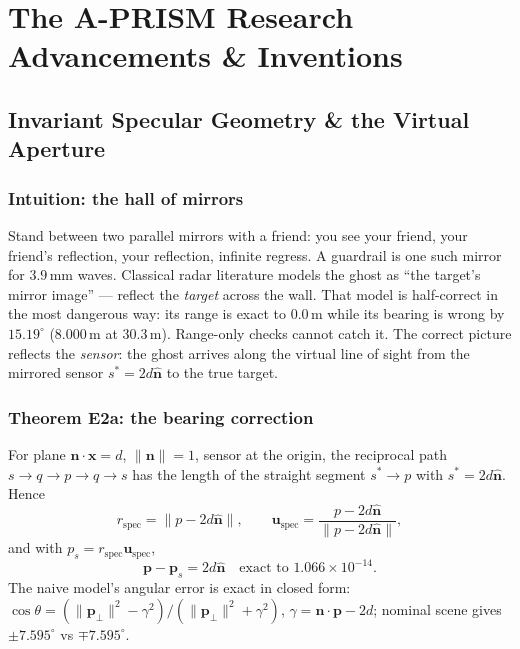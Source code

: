\documentclass[11pt,oneside]{book}
\begin{document}
\part{The A-PRISM Research Advancements \& Inventions}

\chapter{Invariant Specular Geometry \& the Virtual Aperture}
\label{ch:virtual-aperture}

\section{Intuition: the hall of mirrors}
\label{sec:mirrors}

Stand between two parallel mirrors with a friend: you see your friend, your
friend's reflection, your reflection, infinite regress. A guardrail is one
such mirror for $3.9\,\mathrm{mm}$ waves. Classical radar literature models
the ghost as ``the target's mirror image'' --- reflect the \emph{target}
across the wall. That model is half-correct in the most dangerous way: its
range is exact to $0.0\,\mathrm{m}$ while its bearing is wrong by
$15.19^\circ$ ($8.000\,\mathrm{m}$ at $30.3\,\mathrm{m}$). Range-only checks
cannot catch it. The correct picture reflects the \emph{sensor}: the ghost
arrives along the virtual line of sight from the mirrored sensor
$s^*=2d\hat{\mathbf{n}}$ to the true target.

\section{Theorem E2a: the bearing correction}
\label{sec:e2a}

For plane $\mathbf{n}\cdot\mathbf{x}=d$, $\|\mathbf{n}\|=1$, sensor at the
origin, the reciprocal path $s\to q\to p\to q\to s$ has the length of the
straight segment $s^*\to p$ with $s^*=2d\hat{\mathbf{n}}$. Hence
\begin{equation}
r_{\mathrm{spec}}=\|p-2d\hat{\mathbf{n}}\|,\qquad
\mathbf{u}_{\mathrm{spec}}=\frac{p-2d\hat{\mathbf{n}}}{\|p-2d\hat{\mathbf{n}}\|},
\label{eq:ghost-bearing}
\end{equation}
and with $p_s=r_{\mathrm{spec}}\mathbf{u}_{\mathrm{spec}}$,
\begin{equation}
\boxed{\mathbf{p}-\mathbf{p}_s = 2d\hat{\mathbf{n}}\quad\text{exact to }1.066\times10^{-14}.}
\label{eq:rank1}
\end{equation}
The naive model's angular error is exact in closed form:
$\cos\theta=(\|\mathbf{p}_\perp\|^2-\gamma^2)/(\|\mathbf{p}_\perp\|^2+\gamma^2)$,
$\gamma=\mathbf{n}\cdot\mathbf{p}-2d$; nominal scene gives $\pm7.595^\circ$
vs $\mp7.595^\circ$.
\end{document}
